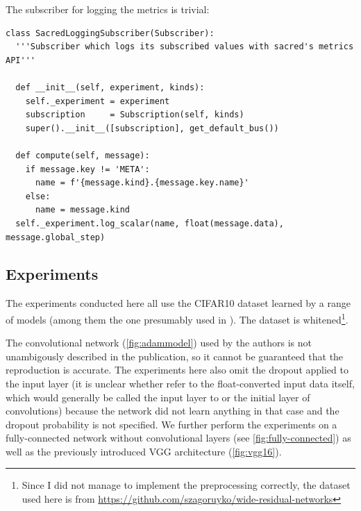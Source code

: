 The subscriber for logging the metrics is trivial:
\begin{lstlisting}
class SacredLoggingSubscriber(Subscriber):
  '''Subscriber which logs its subscribed values with sacred's metrics API'''

  def __init__(self, experiment, kinds):
    self._experiment = experiment
    subscription     = Subscription(self, kinds)
    super().__init__([subscription], get_default_bus())

  def compute(self, message):
    if message.key != 'META':
      name = f'{message.kind}.{message.key.name}'
    else:
      name = message.kind
  self._experiment.log_scalar(name, float(message.data), message.global_step)
\end{lstlisting}


\subsection{Experiments}%
\label{sub:experiments}

The experiments conducted here all use the CIFAR10 dataset learned by a range of
models (among them the one presumably used in \citet{kingma2014adam}). The
dataset is whitened\footnote{Since I did not manage to implement the
preprocessing correctly, the dataset used here is from
\url{https://github.com/szagoruyko/wide-residual-networks}}.

The convolutional network (\cref{fig:adammodel}) used by the authors is not unambigously described in
the publication, so it cannot be guaranteed that the reproduction is accurate.
The experiments here also omit the dropout applied to the input layer (it is
unclear whether \citeauthor{kingma2014adam} refer to the float-converted input
data itself, which would generally be called the input layer to or the initial
layer of convolutions) because the network did not learn anything in that case
and the dropout probability is not specified. We further perform the experiments
on a fully-connected network without convolutional layers (see
\cref{fig:fully-connected}) as well as the previously introduced VGG
architecture (\cref{fig:vgg16}).

